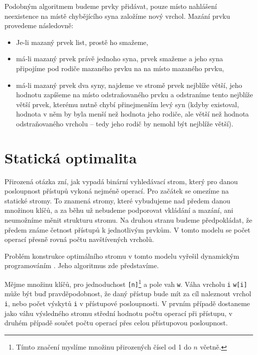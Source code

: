 Podobným algoritmem budeme prvky přidávat, pouze místo nahlášení neexistence na místě chybějícího syna založíme nový vrchol. Mazání prvku provedeme následovně:
\begin{itemize}
\item Je-li mazaný prvek list, prostě ho smažeme,
\item má-li mazaný prvek právě jednoho syna, prvek smažeme a jeho syna připojíme pod rodiče mazaného prvku na na místo mazaného prvku,
\item má-li mazaný prvek dva syny, najdeme ve stromě prvek nejblíže větší, jeho
hodnotu zapíšeme na místo odstraňovaného prvku a odstraníme tento nejblíže větší
prvek, kterému nutně chybí přinejmenším levý syn (kdyby existoval, hodnota v
něm by byla menší než hodnota jeho rodiče, ale větší než hodnota odstraňovaného
vrcholu -- tedy jeho rodič by nemohl být nejblíže větší).  
\end{itemize} 

\section{Statická optimalita}

Přirozená otázka zní, jak vypadá binární vyhledávací strom, který pro danou
posloupnost přístupů vykoná nejméně operací. Pro začátek se omezíme na statické
stromy. To znamená stromy, které vybudujeme nad předem danou množinou klíčů, a
za běhu už nebudeme podporovat vkládání a mazání, ani neumožníme měnit
strukturu stromu. Na druhou stranu budeme předpokládat, že předem známe četnost
přístupů k jednotlivým prvkům. V tomto modelu se počet operací přesně rovná
počtu navštívených vrcholů.

Problém konstrukce optimálního stromu v tomto modelu vyřešil dynamickým
programováním \citet{staticoptimality}. Jeho algoritmus zde představíme.

Mějme množinu klíčů, pro jednoduchost {\tt [n]}\footnote{Tímto značení myslíme
množinu přirozených čísel od 1 do $n$ včetně.} a pole vah {\tt w}. Váha vrcholu
{\tt i} {\tt w[i]} může být buď pravděpodobnost, že daný přístup bude mít za
cíl naleznout vrchol {\tt i}, nebo počet výskytů {\tt i} v přístupové
posloupnosti. V prvním případě dostaneme jako váhu výsledného stromu střední
hodnotu počtu operací při přístupu, v druhém případě součet počtu operací přes
celou přístupovou posloupnost.

